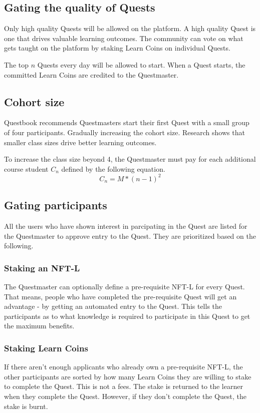 \documentclass{article}
\begin{document}
    \subsection{Gating the quality of Quests}
        Only high quality Quests will be allowed on the platform.
        A high quality Quest is one that drives valuable learning outcomes. 
        The community can vote on what gets taught on the platform by staking Learn Coins on individual Quests.
        \par
        The top \(n\) Quests every day will be allowed to start. 
        When a Quest starts, the committed Learn Coins are credited to the Questmaster.
    \subsection{Cohort size}
      Questbook recommends Questmasters start their first Quest with a small group of four participants. Gradually increasing the cohort size. 
      Research shows that smaller class sizes drive better learning outcomes. %
      \par 
      To increase the class size beyond 4, the Questmaster must pay for each additional course student \(C_n\) defined by the following equation.
      \[
        C_n = M * (n-1)^2
      \]
    \subsection{Gating participants}
      All the users who have shown interest in parcipating in the Quest are listed for the Questmaster to approve entry to the Quest. They are prioritized based on the following.
      \subsubsection{Staking an NFT-L}
        The Questmaster can optionally define a pre-requisite NFT-L for every Quest. That means, people who have completed the pre-requisite Quest will get an advantage - by getting an automated entry to the Quest.
        This tells the participants as to what knowledge is required to participate in this Quest to get the maximum benefits. 
      \subsubsection{Staking Learn Coins}
        If there aren't enough applicants who already own a pre-requisite NFT-L, the other participants are sorted by how many Learn Coins they are willing to stake to complete the Quest. This is not a fees. The stake is returned to the learner when they complete the Quest. However, if they don't complete the Quest, the stake is burnt.
\end{document}
